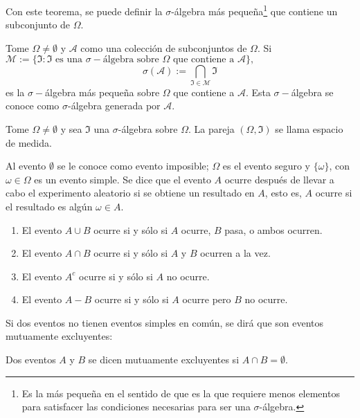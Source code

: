 	Con este teorema, se puede definir la $\sigma$-álgebra más pequeña\footnote{Es la más pequeña en el sentido de que es la que requiere menos elementos para satisfacer las condiciones necesarias para ser una $\sigma$-álgebra.} que contiene un subconjunto de $\Omega$. 	
	\begin{defi}
		Tome $\Omega\neq\emptyset$ y $\mathcal{A}$ como una colección de subconjuntos de $\Omega$. Si $\mathcal{M}:=\{\Im:\Im\text{ es una }\sigma-\text{álgebra sobre }\Omega \text{ que contiene a } \mathcal{A}\},$
		$$\sigma(\mathcal{A}):=\bigcap_{\Im\in \mathcal{M}}\Im$$
		es la $\sigma-$álgebra más pequeña sobre $\Omega$ que contiene a $\mathcal{A}$. Esta $\sigma-$álgebra se conoce como $\sigma$-álgebra generada por $\mathcal{A}$.
	\end{defi}
	
	\begin{defi}
		Tome $\Omega\neq\emptyset$ y sea $\Im$ una $\sigma$-álgebra sobre $\Omega$. La pareja $(\Omega,\Im)$ se llama espacio de medida.
	\end{defi}
	
	Al evento $\emptyset$ se le conoce como evento imposible; $\Omega$ es el evento seguro y $\{\omega\}$, con $\omega\in\Omega$ es un evento simple. Se dice que el evento $A$ ocurre después de llevar a cabo el experimento aleatorio si se obtiene un resultado en $A$, esto es, $A$ ocurre si el resultado es algún $\omega\in A$.
	\begin{enumerate}
		\item El evento $A\cup B$ ocurre si y sólo si $A$ ocurre, $B$ pasa, o ambos ocurren.
		\item El evento $A\cap B$ ocurre si y sólo si $A$ y $B$ ocurren a la vez.
		\item El evento $A^c$ ocurre si y sólo si $A$ no ocurre.
		\item El evento $A-B$ ocurre si y sólo si $A$ ocurre pero $B$ no ocurre.
	\end{enumerate}
	Si dos eventos no tienen eventos simples en común, se dirá que son eventos mutuamente excluyentes:
	\begin{defi}
		Dos eventos $A$ y $B$ se dicen mutuamente excluyentes si $A\cap B=\emptyset$.
	\end{defi}
	
